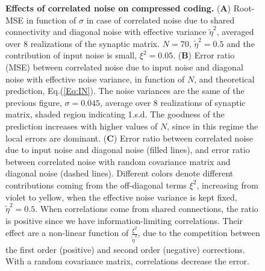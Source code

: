 \documentclass[a4paper]{article}
\begin{document}
\begin{figure}
\centering
{}
\caption{\textbf{Effects of correlated noise on compressed coding.} (\textbf{A}) Root-MSE in function of $\sigma$ in case of correlated noise due to shared connectivity and diagonal noise with effective variance $\tilde\eta^2$, averaged over 8 realizations of the synaptic matrix. $N=70$, $\tilde\eta^2 = 0.5$  and the contribution of input noise is small, $\xi^2 = 0.05$.
(\textbf{B}) Error ratio (MSE) between correlated noise due to input noise and diagonal noise with effective noise variance, in function of $N$, and theoretical prediction, Eq.(\ref{Eq:IN}). The noise variances are the same of the previous figure, $\sigma=0.045$, average over 8 realizations of synaptic matrix, shaded region indicating 1.s.d. The goodness of the prediction increases with higher values of $N$, since in this regime the local errors are dominant. (\textbf{C}) Error ratio between correlated noise due to input noise and diagonal noise (filled lines), and error ratio between correlated noise with random covariance matrix and diagonal noise (dashed lines). Different colors denote different contributions coming from the off-diagonal terms  $\xi^2$, increasing from violet to yellow, when the effective noise variance is kept fixed, $\tilde\eta^2 = 0.5$. When correlations come from shared connections, the ratio is positive since we have information-limiting correlations. Their effect are a non-linear function of $\frac{\xi^2}{\tilde\eta^2}$, due to the competition between the first order (positive) and second order (negative) corrections. With a random covariance matrix, correlations decrease the error.}
\label{Fig:8}
\end{figure}
\clearpage
\end{document}
